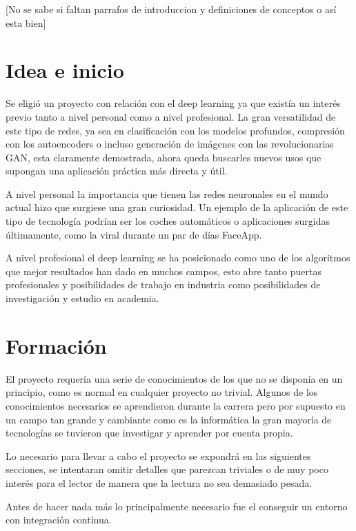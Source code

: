
[No se sabe si faltan parrafos de introduccion y definiciones de conceptos o así esta bien]


\section{Idea e inicio}

Se eligió un proyecto con relación con el deep learning ya que existía un interés previo tanto a nivel personal como a nivel profesional. La gran versatilidad de este tipo de redes, ya sea en clasificación con los modelos profundos, compresión con los autoencoders o incluso generación de imágenes con las revolucionarias GAN, esta claramente demostrada, ahora queda buscarles nuevos usos que supongan una aplicación práctica más directa y útil. 

A nivel personal la importancia que tienen las redes neuronales en el mundo actual hizo que surgiese una gran curiosidad. Un ejemplo de la aplicación de este tipo de tecnología podrían ser los coches automáticos o aplicaciones surgidas últimamente, como la viral durante un par de días FaceApp. 

A nivel profesional el deep learning se ha posicionado como uno de los algoritmos que mejor resultados han dado en muchos campos, esto abre tanto puertas profesionales y posibilidades de trabajo en industria como posibilidades de investigación y estudio en academia. 



\section{Formación}
El proyecto requería una serie de conocimientos de los que no se disponía en un principio, como es normal en cualquier proyecto no trivial. Algunos de los conocimientos necesarios se aprendieron durante la carrera pero por supuesto en un campo tan grande y cambiante como es la informática la gran mayoría de tecnologías se tuvieron que investigar y aprender por cuenta propia.

Lo necesario para llevar a cabo el proyecto se expondrá en las siguientes secciones, se intentaran omitir detalles que parezcan triviales o de muy poco interés para el lector de manera que la lectura no sea demasiado pesada.

Antes de hacer nada más lo principalmente necesario fue el conseguir un entorno con integración continua. 


